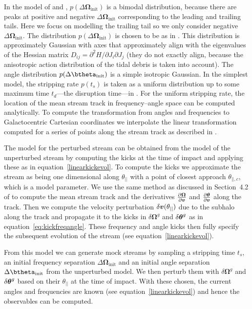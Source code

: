 \documentclass[useAMS,usenatbib,fleqn,a4paper]{mn2e}
\newcommand{\bs}[1]{\bmath{#1}}
\begin{document}
In the model of \cite{Bovy2014} and \cite{Sanders2014}, $p(\Delta\boldsymbol{\Omega}_\mathrm{init})$ is a bimodal distribution, because there are peaks at positive and negative $\Delta\boldsymbol{\Omega}_\mathrm{init}$ corresponding to the leading and trailing tails. Here we focus on modelling the trailing tail so we only consider negative $\Delta\boldsymbol{\Omega}_\mathrm{init}$. The distribution $p(\Delta\boldsymbol{\Omega}_\mathrm{init})$ is chosen to be as in \cite{Bovy2014}. This distribution is approximately Gaussian with axes that approximately align with the eigenvalues of the Hessian matrix $D_{ij}=\partial^2H/\partial J_i\partial J_j$ (they do not exactly align, because the anisotropic action distribution of the tidal debris is taken into account). The angle distribution $p(\Delta\btheta_\mathrm{init})$ is a simple isotropic Gaussian. In the simplest model, the stripping rate $p(t_s)$ is taken as a uniform distribution up to some maximum time $t_d$---the disruption time---in \cite{Bovy2014}. For the uniform stripping rate, the location of the mean stream track in frequency--angle space can be computed analytically. To compute the transformation from angles and frequencies to Galactocentric Cartesian coordinates we interpolate the linear transformation computed for a series of points along the stream track as described in \cite{Bovy2014}.

The model for the perturbed stream can be obtained from the model of the unperturbed stream by computing the kicks at the time of impact and applying these as in equation~\eqref{linearkickevol}. To compute the kicks we approximate the stream as being one dimensional along $\theta_{||}$ with a point of closest approach $\theta_{||,c}$, which is a model parameter. We use the same method as discussed in Section~4.2 of \cite{Bovy2014} to compute the mean stream track and the derivatives $\frac{\upartial \boldsymbol{\Omega}}{\upartial \bs{v}}$ and $\frac{\upartial \bs{\theta}}{\upartial \bs{v}}$ along the track. Then we compute the velocity perturbation $\delta\bs{v}(\theta_{||})$ due to the subhalo along the track and propagate it to the kicks in $\delta \boldsymbol{\Omega}^g$ and $\delta \bs{\theta}^g$ as in equation~\eqref{eq:kickfreqangle}. These frequency and angle kicks then fully specify the subsequent evolution of the stream (see equation~\eqref{linearkickevol}).

From this model we can generate mock streams by sampling a stripping time $t_s$, an initial frequency separation $\Delta\boldsymbol{\Omega}_\mathrm{init}$ and an initial angle separation $\Delta\btheta_\mathrm{init}$ from the unperturbed model. We then perturb them with $\delta \boldsymbol{\Omega}^g$ and $\delta \bs{\theta}^g$ based on their $\theta_{||}$ at the time of impact. With these chosen, the current angles and frequencies are known (see equation~\eqref{linearkickevol}) and hence the observables can be computed.
\end{document}
